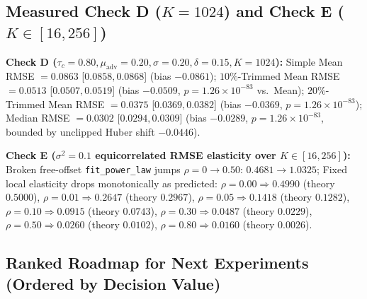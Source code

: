 \documentclass[11pt]{article}
\begin{document}
\subsection{\texorpdfstring{Measured Check D ($K=1024$) and Check E ($K \in [16, 256]$)}{Large-panel median bias and local scaling}}

\textbf{Check D ($\tau_c=0.80, \mu_{\mathrm{adv}}=0.20, \sigma=0.20, \delta=0.15, K=1024$):}
Simple Mean RMSE $= 0.0863$ [$0.0858, 0.0868$] (bias $-0.0861$);
$10\%$-Trimmed Mean RMSE $= 0.0513$ [$0.0507, 0.0519$] (bias $-0.0509$, $p = 1.26\times 10^{-83}$ vs.\ Mean);
$20\%$-Trimmed Mean RMSE $= 0.0375$ [$0.0369, 0.0382$] (bias $-0.0369$, $p = 1.26\times 10^{-83}$);
Median RMSE $= 0.0302$ [$0.0294, 0.0309$] (bias $-0.0289$, $p = 1.26\times 10^{-83}$, bounded by unclipped Huber shift $-0.0446$).

\textbf{Check E ($\sigma^2=0.1$ equicorrelated RMSE elasticity over $K \in [16, 256]$):}
Broken free-offset \texttt{fit\_power\_law} jumps $\rho=0 \to 0.50$: $0.4681 \to 1.0325$;
Fixed local elasticity drops monotonically as predicted: $\rho=0.00 \Rightarrow 0.4990$ (theory $0.5000$), $\rho=0.01 \Rightarrow 0.2647$ (theory $0.2967$), $\rho=0.05 \Rightarrow 0.1418$ (theory $0.1282$), $\rho=0.10 \Rightarrow 0.0915$ (theory $0.0743$), $\rho=0.30 \Rightarrow 0.0487$ (theory $0.0229$), $\rho=0.50 \Rightarrow 0.0260$ (theory $0.0102$), $\rho=0.80 \Rightarrow 0.0160$ (theory $0.0026$).

\subsection{Ranked Roadmap for Next Experiments (Ordered by Decision Value)}
\end{document}
